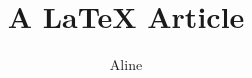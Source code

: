 \documentclass[]{article}
\title{A LaTeX Article}
\author{Aline}
\begin{document}
\maketitle


\begin{abstract}
\end{abstract}





\end{document}

